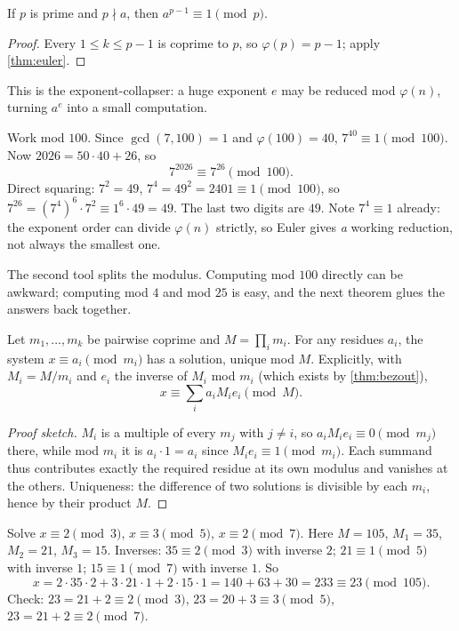 \begin{corollary}\label{cor:fermat}
If $p$ is prime and $p \nmid a$, then $a^{p-1} \equiv 1 \pmod{p}$.
\end{corollary}

\begin{proof}
Every $1 \le k \le p-1$ is coprime to $p$, so $\varphi(p)=p-1$; apply
\cref{thm:euler}.
\end{proof}

This is the exponent-collapser: a huge exponent $e$ may be reduced
mod $\varphi(n)$, turning $a^e$ into a small computation.

\begin{example}
Work mod $100$. Since $\gcd(7,100)=1$ and $\varphi(100)=40$,
$7^{40} \equiv 1 \pmod{100}$. Now $2026 = 50\cdot 40 + 26$, so
\[
  7^{2026} \equiv 7^{26} \pmod{100}.
\]
Direct squaring: $7^2 = 49$, $7^4 = 49^2 = 2401 \equiv 1 \pmod{100}$,
so $7^{26} = (7^4)^6\cdot 7^2 \equiv 1^6\cdot 49 = 49$.
The last two digits are $49$. Note $7^4 \equiv 1$ already: the exponent
order can divide $\varphi(n)$ strictly, so Euler gives \emph{a}
working reduction, not always the smallest one.
\end{example}

The second tool splits the modulus. Computing mod $100$ directly can be
awkward; computing mod $4$ and mod $25$ is easy, and the next theorem
glues the answers back together.

\begin{theorem}\label{thm:crt}
Let $m_1,\ldots,m_k$ be pairwise coprime and $M = \prod_i m_i$.
For any residues $a_i$, the system $x \equiv a_i \pmod{m_i}$ has a
solution, unique mod $M$. Explicitly, with $M_i = M/m_i$ and $e_i$
the inverse of $M_i$ mod $m_i$ (which exists by \cref{thm:bezout}),
\[
  x \equiv \sum_i a_i M_i e_i \pmod{M}.
\]
\end{theorem}

\begin{proof}[Proof sketch]
$M_i$ is a multiple of every $m_j$ with $j \ne i$, so
$a_iM_ie_i \equiv 0 \pmod{m_j}$ there, while mod $m_i$ it is
$a_i \cdot 1 = a_i$ since $M_ie_i \equiv 1 \pmod{m_i}$. Each summand
thus contributes exactly the required residue at its own modulus and
vanishes at the others. Uniqueness: the difference of two solutions is
divisible by each $m_i$, hence by their product $M$.
\end{proof}

\begin{example}
Solve $x \equiv 2 \pmod{3}$, $x \equiv 3 \pmod{5}$, $x \equiv 2 \pmod{7}$.
Here $M = 105$, $M_1 = 35$, $M_2 = 21$, $M_3 = 15$.
Inverses: $35 \equiv 2 \pmod{3}$ with inverse $2$; $21 \equiv 1 \pmod{5}$
with inverse $1$; $15 \equiv 1 \pmod{7}$ with inverse $1$. So
\[
  x = 2\cdot 35\cdot 2 + 3\cdot 21\cdot 1 + 2\cdot 15\cdot 1
  = 140 + 63 + 30 = 233 \equiv 23 \pmod{105}.
\]
Check: $23 = 21+2 \equiv 2 \pmod{3}$, $23 = 20+3 \equiv 3 \pmod{5}$,
$23 = 21+2 \equiv 2 \pmod{7}$.
\end{example}

